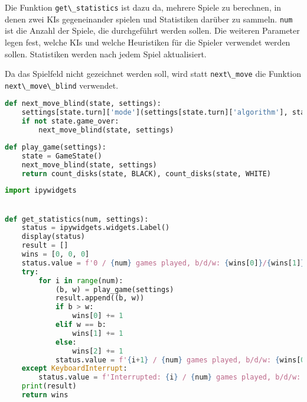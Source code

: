 Die Funktion \passthrough{\lstinline!get\_statistics!} ist dazu da,
mehrere Spiele zu berechnen, in denen zwei KIs gegeneinander spielen und
Statistiken darüber zu sammeln. \passthrough{\lstinline!num!} ist die
Anzahl der Spiele, die durchgeführt werden sollen. Die weiteren
Parameter legen fest, welche KIs und welche Heuristiken für die Spieler
verwendet werden sollen. Statistiken werden nach jedem Spiel
aktualisiert.

Da das Spielfeld nicht gezeichnet werden soll, wird statt
\passthrough{\lstinline!next\_move!} die Funktion
\passthrough{\lstinline!next\_move\_blind!} verwendet.

\begin{lstlisting}[language=Python]
def next_move_blind(state, settings):
    settings[state.turn]['mode'](settings[state.turn]['algorithm'], state, settings[state.turn]['depth'], settings[state.turn]['heuristic'])
    if not state.game_over:
        next_move_blind(state, settings)
\end{lstlisting}

\begin{lstlisting}[language=Python]
def play_game(settings):
    state = GameState()
    next_move_blind(state, settings)
    return count_disks(state, BLACK), count_disks(state, WHITE)
\end{lstlisting}

\begin{lstlisting}[language=Python]
import ipywidgets


def get_statistics(num, settings):
    status = ipywidgets.widgets.Label()
    display(status)
    result = []
    wins = [0, 0, 0]
    status.value = f'0 / {num} games played, b/d/w: {wins[0]}/{wins[1]}/{wins[2]}'
    try:
        for i in range(num):
            (b, w) = play_game(settings)
            result.append((b, w))
            if b > w:
                wins[0] += 1
            elif w == b:
                wins[1] += 1
            else:
                wins[2] += 1
            status.value = f'{i+1} / {num} games played, b/d/w: {wins[0]}/{wins[1]}/{wins[2]}'
    except KeyboardInterrupt:
        status.value = f'Interrupted: {i} / {num} games played, b/d/w: {wins[0]}/{wins[1]}/{wins[2]}'
    print(result)
    return wins
\end{lstlisting}
